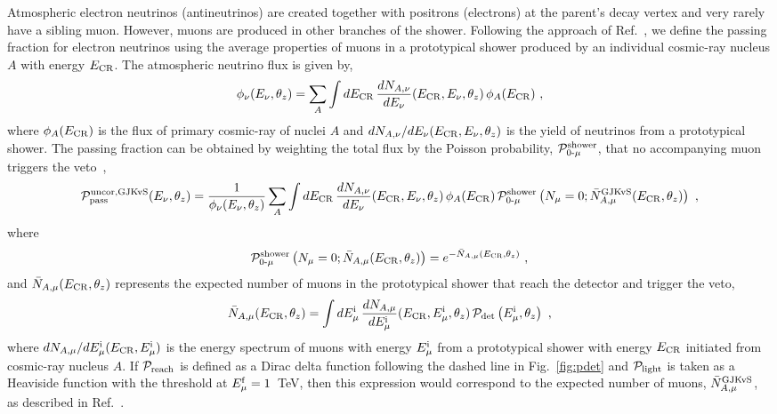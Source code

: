 \documentclass[aps,prd,showpacs,letterpaper,onecolumn,longbibliography,superscriptaddress,notitlepage,nofootinbib]{revtex4-1}%
\newcommand{\Emf}{E_{\mu}^{\rm f}}
\newcommand{\Emi}{E_{\mu}^{\rm i}}
\newcommand{\ECR}{E_{\rm CR}}
\newcommand{\Prob}{{\cal P}}
\newcommand{\Pzmproto}{\Prob_{0\text{-}\mu}^{\rm shower}}
\begin{document}
\begin{figure}
{}
\label{fig:nue_passing-double-counting}
\end{figure}

Atmospheric electron neutrinos (antineutrinos) are created together with positrons (electrons) at the parent's decay vertex and very rarely have a sibling muon. However, muons are produced in other branches of the shower. Following the approach of Ref.~\cite{Gaisser:2014bja}, we define the passing fraction for electron neutrinos using the average properties of muons in a prototypical shower produced by an individual cosmic-ray nucleus $A$ with energy $\ECR$. The atmospheric neutrino flux is given by,
\begin{equation}
\label{eq:nuphi}
\phi_\nu(E_\nu, \theta_z)  = \sum_A \int d\ECR \, \frac{dN_{A, \nu}}{dE_\nu}(\ECR, E_\nu, \theta_z) \, \phi_A(\ECR)~,
\end{equation}
where $\phi_A(\ECR)$ is the flux of primary cosmic-ray of nuclei $A$ and $dN_{A, \nu}/dE_\nu(\ECR, E_\nu, \theta_z)$ is the yield of neutrinos from a prototypical shower. The passing fraction can be obtained by weighting the total flux by the Poisson probability, $\Pzmproto$, that no accompanying muon triggers the veto~\cite{Gaisser:2014bja},
%
\begin{equation}
\label{eq:PuncorGJKvS}
\Prob_{\rm pass}^{\rm uncor, GJKvS}(E_\nu, \theta_z)  =  \frac{1}{\phi_\nu(E_\nu, \theta_z)} \sum_A \int d\ECR \, \frac{dN_{A, \nu}}{dE_\nu}(\ECR, E_\nu, \theta_z) \, \phi_A(\ECR) \, \Pzmproto \left(N_\mu = 0  ; \bar N_{A, \mu}^{\rm GJKvS}(\ECR, \theta_z)\right)~,
\end{equation}
%
where
%
\begin{equation}
\label{eq:pnomuproto}
\Pzmproto \left(N_\mu = 0  ; \bar N_{A, \mu}(\ECR, \theta_z)\right) = e^{- \bar N_{A, \mu}(\ECR, \theta_z)} ~,
\end{equation}
%
and $\bar N_{A, \mu}(\ECR, \theta_z)$ represents the expected number of muons in the prototypical shower that reach the detector and trigger the veto,
%
\begin{equation}
\label{eq:Nmu}
\bar N_{A, \mu}(\ECR,\theta_z) = \int d\Emi \, \frac{dN_{A, \mu}}{d\Emi}(\ECR, \Emi,  \theta_z) \, \Prob_{\rm det}\left(\Emi , \theta_z\right) ~,
\end{equation}
%
where $dN_{A, \mu}/d\Emi(\ECR, \Emi)$ is the energy spectrum of muons with energy $\Emi$ from a prototypical shower with energy $\ECR$ initiated from cosmic-ray nucleus $A$. If $\Prob_{\rm reach}$ is defined as a Dirac delta function following the dashed line in Fig.~\ref{fig:pdet} and $\Prob_{\rm light}$ is taken as a Heaviside function with the threshold at $\Emf = 1$~TeV, then this expression would correspond to the expected number of muons, $\bar N_{A, \mu}^{\rm GJKvS}$, as described in Ref.~\cite{Gaisser:2014bja}. 
\end{document}
